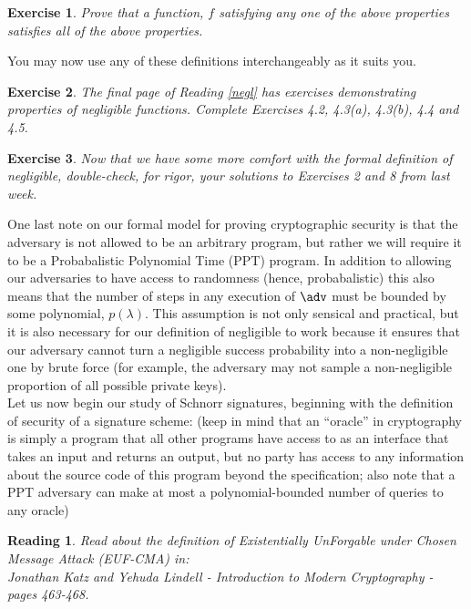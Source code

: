 \documentclass[12pt]{article}
\newtheorem{exercise}{Exercise}
\newtheorem{reading}{Reading}
\theoremstyle{definition}
\theoremstyle{remark}
\theoremstyle{definition}
\begin{document}
\begin{exercise}
Prove that a function, $f$ satisfying any one of the above properties satisfies all of the above properties.
\end{exercise}

You may now use any of these definitions interchangeably as it suits you.

\begin{exercise}
The final page of Reading \ref{negl} has exercises demonstrating properties of negligible functions. Complete Exercises 4.2, 4.3(a), 4.3(b), 4.4 and 4.5.
\end{exercise}

\begin{exercise}
Now that we have some more comfort with the formal definition of negligible, double-check, for rigor, your solutions to Exercises 2 and 8 from last week.
\end{exercise}

One last note on our formal model for proving cryptographic security is that the adversary is not allowed to be an arbitrary program, but rather we will require it to be a Probabalistic Polynomial Time (PPT) program. In addition to allowing our adversaries to have access to randomness (hence, probabalistic) this also means that the number of steps in any execution of $\adv$ must be bounded by some polynomial, $p(\lambda)$. This assumption is not only sensical and practical, but it is also necessary for our definition of negligible to work because it ensures that our adversary cannot turn a negligible success probability into a non-negligible one by brute force (for example, the adversary may not sample a non-negligible proportion of all possible private keys).\\

Let us now begin our study of Schnorr signatures, beginning with the definition of security of a signature scheme: (keep in mind that an ``oracle'' in cryptography is simply a program that all other programs have access to as an interface that takes an input and returns an output, but no party has access to any information about the source code of this program beyond the specification; also note that a PPT adversary can make at most a polynomial-bounded number of queries to any oracle)

\begin{reading}
Read about the definition of Existentially UnForgable under Chosen Message Attack (EUF-CMA) in:\\
Jonathan Katz and Yehuda Lindell - Introduction to Modern Cryptography - pages 463-468.
\end{reading}
\end{document}
